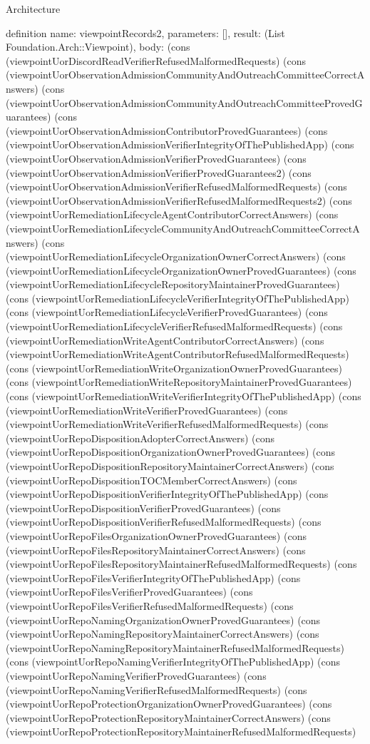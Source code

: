 \begin{lexlean}{Architecture}
\begin{semanticmodule}
definition{
  name: viewpointRecords2,
  parameters: [],
  result: (List Foundation.Arch::Viewpoint),
  body: (cons (viewpointUorDiscordReadVerifierRefusedMalformedRequests) (cons (viewpointUorObservationAdmissionCommunityAndOutreachCommitteeCorrectAnswers) (cons (viewpointUorObservationAdmissionCommunityAndOutreachCommitteeProvedGuarantees) (cons (viewpointUorObservationAdmissionContributorProvedGuarantees) (cons (viewpointUorObservationAdmissionVerifierIntegrityOfThePublishedApp) (cons (viewpointUorObservationAdmissionVerifierProvedGuarantees) (cons (viewpointUorObservationAdmissionVerifierProvedGuarantees2) (cons (viewpointUorObservationAdmissionVerifierRefusedMalformedRequests) (cons (viewpointUorObservationAdmissionVerifierRefusedMalformedRequests2) (cons (viewpointUorRemediationLifecycleAgentContributorCorrectAnswers) (cons (viewpointUorRemediationLifecycleCommunityAndOutreachCommitteeCorrectAnswers) (cons (viewpointUorRemediationLifecycleOrganizationOwnerCorrectAnswers) (cons (viewpointUorRemediationLifecycleOrganizationOwnerProvedGuarantees) (cons (viewpointUorRemediationLifecycleRepositoryMaintainerProvedGuarantees) (cons (viewpointUorRemediationLifecycleVerifierIntegrityOfThePublishedApp) (cons (viewpointUorRemediationLifecycleVerifierProvedGuarantees) (cons (viewpointUorRemediationLifecycleVerifierRefusedMalformedRequests) (cons (viewpointUorRemediationWriteAgentContributorCorrectAnswers) (cons (viewpointUorRemediationWriteAgentContributorRefusedMalformedRequests) (cons (viewpointUorRemediationWriteOrganizationOwnerProvedGuarantees) (cons (viewpointUorRemediationWriteRepositoryMaintainerProvedGuarantees) (cons (viewpointUorRemediationWriteVerifierIntegrityOfThePublishedApp) (cons (viewpointUorRemediationWriteVerifierProvedGuarantees) (cons (viewpointUorRemediationWriteVerifierRefusedMalformedRequests) (cons (viewpointUorRepoDispositionAdopterCorrectAnswers) (cons (viewpointUorRepoDispositionOrganizationOwnerProvedGuarantees) (cons (viewpointUorRepoDispositionRepositoryMaintainerCorrectAnswers) (cons (viewpointUorRepoDispositionTOCMemberCorrectAnswers) (cons (viewpointUorRepoDispositionVerifierIntegrityOfThePublishedApp) (cons (viewpointUorRepoDispositionVerifierProvedGuarantees) (cons (viewpointUorRepoDispositionVerifierRefusedMalformedRequests) (cons (viewpointUorRepoFilesOrganizationOwnerProvedGuarantees) (cons (viewpointUorRepoFilesRepositoryMaintainerCorrectAnswers) (cons (viewpointUorRepoFilesRepositoryMaintainerRefusedMalformedRequests) (cons (viewpointUorRepoFilesVerifierIntegrityOfThePublishedApp) (cons (viewpointUorRepoFilesVerifierProvedGuarantees) (cons (viewpointUorRepoFilesVerifierRefusedMalformedRequests) (cons (viewpointUorRepoNamingOrganizationOwnerProvedGuarantees) (cons (viewpointUorRepoNamingRepositoryMaintainerCorrectAnswers) (cons (viewpointUorRepoNamingRepositoryMaintainerRefusedMalformedRequests) (cons (viewpointUorRepoNamingVerifierIntegrityOfThePublishedApp) (cons (viewpointUorRepoNamingVerifierProvedGuarantees) (cons (viewpointUorRepoNamingVerifierRefusedMalformedRequests) (cons (viewpointUorRepoProtectionOrganizationOwnerProvedGuarantees) (cons (viewpointUorRepoProtectionRepositoryMaintainerCorrectAnswers) (cons (viewpointUorRepoProtectionRepositoryMaintainerRefusedMalformedRequests) }
\end{semanticmodule}
\end{lexlean}
